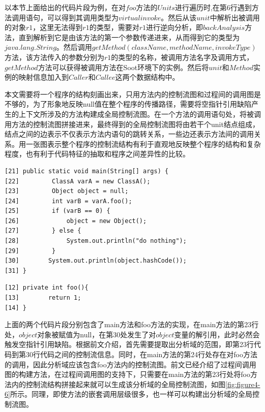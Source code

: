 以本节上面给出的代码片段为例，在对$foo$方法的$Units$进行遍历时,在第6行遇到方法调用语句，可以得到其调用类型为$virtualinvoke$。然后从该$unit$中解析出被调用的对象$r1$，这里无法得到$r1$的类型，需要对$r1$进行逆向分析，即$backAnalysis$方法，直到解析到它是由该方法的第一个参数传递进来，从而得到它的类型为$java.lang.String$。然后调用$getMethod(className,methodName,invokeType)$方法，该方法传入的参数分别为$r1$的类型的名称，被调用方法名字及调用方式，$getMethod$方法可以获得被调用方法在Soot环境下的实例。然后将$unit$和$Method$实例的映射信息加入到$Caller$和$Callee$这两个数据结构中。

本文需要将一个程序的结构刻画出来，只用方法内的控制流图和过程间的调用图是不够的，为了形象地反映null值在整个程序的传播路径，需要将空指针引用缺陷产生的上下文所涉及的方法构建成全局控制流图。在一个方法的调用语句处，将被调用方法的控制流图拼接进来，最终得到的全局控制流图将由若干个unit结点组成，结点之间的边表示不仅表示方法内语句的跳转关系，一些边还表示方法间的调用关系。用一张图表示整个程序的控制流结构有利于直观地反映整个程序的结构和复杂程度，也有利于代码特征的抽取和程序之间差异性的比较。

\begin{lstlisting}[language={[AspectJ]Java},keywordstyle=\color{blue!70},commentstyle=\color{red!50!green!50!blue!50},frame=shadowbox, rulesepcolor=\color{red!20!green!20!blue!20}] 
[21] public static void main(String[] args) {
[22]         ClassA varA = new ClassA();
[23]         Object object = null;
[24]         int varB = varA.foo();
[25]         if (varB == 0) {
[26]             object = new Object();
[27]         } else {
[28]             System.out.println("do nothing");
[29]         }
[30]        System.out.println(object.hashCode());
[31] }
\end{lstlisting}

\begin{lstlisting}[language={[AspectJ]Java},keywordstyle=\color{blue!70},commentstyle=\color{red!50!green!50!blue!50},frame=shadowbox, rulesepcolor=\color{red!20!green!20!blue!20}] 
[12] private int foo(){
[13]        return 1;
[14] }
\end{lstlisting}

上面的两个代码片段分别包含了main方法和foo方法的实现，在main方法的第23行处，$object$对象被赋值为null，在第30处发生了对$object$变量的解引用，此时必然会触发空指针引用缺陷。根据前文介绍，首先需要提取出分析域的范围，即第23行代码到第30行代码之间的控制流信息。同时，在main方法的第24行处存在对foo方法的调用，因此分析域应该包含foo方法内的控制流图。前文已经介绍了过程间调用图的构建方法，在过程间调用图的支持下，只需要在main方法的第23行处将foo方法内的控制流结构拼接起来就可以生成该分析域的全局控制流图，如图\ref{fig:figure4-6}所示。同理，即使方法的嵌套调用层级很多，也一样可以构建出分析域的全局控制流图。

